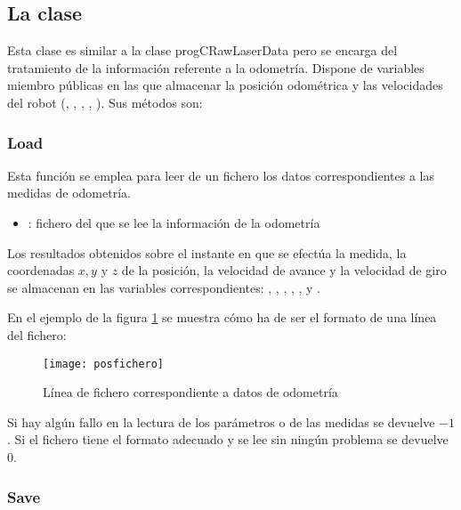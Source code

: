 \subsection{La clase } \label{CPosData}

Esta clase es similar a la clase prog{CRawLaserData} pero se encarga del tratamiento de la información referente a la odometría. Dispone de variables miembro públicas en las que almacenar la posición odométrica y las velocidades del robot (, , , , ). Sus métodos son:

\subsubsection{Load}

\noindent
{}

\noindent
Esta función se emplea para leer de un fichero los datos correspondientes a las medidas de odometría.

\begin{itemize}
  \item {}: fichero del que se lee la información de la odometría
\end{itemize}

\noindent
Los resultados obtenidos sobre el instante en que se efectúa la medida, la coordenadas $x, y$ y $z$ de la posición, la velocidad de avance y la velocidad de giro se almacenan en las variables correspondientes: , , , , ,  y .

En el ejemplo de la figura \ref{fg:ficheropos} se muestra cómo ha de ser el formato de una línea del fichero:

\begin{figure}[h]
  \centering\texttt{[image: posfichero]}\\
  \caption{Línea de fichero correspondiente a datos de odometría}\label{fg:ficheropos}
\end{figure}

\noindent
Si hay algún fallo en la lectura de los parámetros o de las medidas se devuelve $-1$. Si el fichero tiene el formato adecuado y se lee sin ningún problema se devuelve $0$.

\subsubsection{Save}

